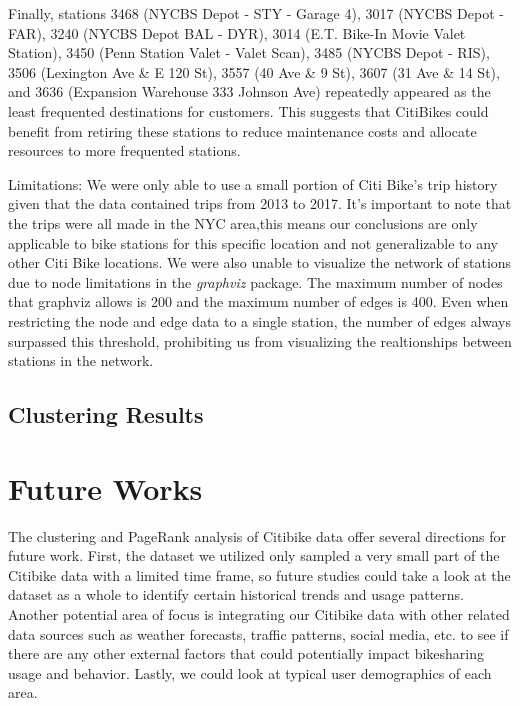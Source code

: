 \documentclass{article}
\begin{document}
 \par
Finally, stations 3468 (NYCBS Depot - STY - Garage 4), 3017 (NYCBS Depot - FAR), 3240 (NYCBS Depot BAL - DYR), 3014 (E.T. Bike-In Movie Valet Station), 3450 (Penn Station Valet - Valet Scan), 3485 (NYCBS Depot - RIS), 3506 (Lexington Ave \& E 120 St), 3557 (40 Ave \& 9 St), 3607 (31 Ave \& 14 St), and 3636 (Expansion Warehouse 333 Johnson Ave) repeatedly appeared as the least frequented destinations for customers. This suggests that CitiBikes could benefit from retiring these stations to reduce maintenance costs and allocate resources to more frequented stations. 
\par
Limitations: 
We were only able to use a small portion of Citi Bike's trip history given that the data contained trips from 2013 to 2017. It's important to note that the trips were all made in the NYC area,this means our conclusions are only applicable to bike stations for this specific location and not generalizable to any other Citi Bike locations. We were also unable to visualize the  network of stations due to node limitations in the \emph{graphviz} package. The maximum number of nodes that graphviz allows is 200 and the maximum number of edges is 400. Even when restricting the node and edge data to a single station, the number of edges always surpassed this threshold, prohibiting us from visualizing the realtionships between stations in the network.
 \subsection{Clustering Results}


\section{Future Works}
The clustering and PageRank analysis of Citibike data offer several directions for future work. First, the dataset we utilized only sampled a very small part of the Citibike data with a limited time frame, so future studies could take a look at the dataset as a whole to identify certain historical trends and usage patterns. Another potential area of focus is integrating our Citibike data with other related data sources such as weather forecasts, traffic patterns, social media, etc. to see if there are any other external factors that could potentially impact bikesharing usage and behavior. Lastly, we could look at typical user demographics of each area.
\end{document}
